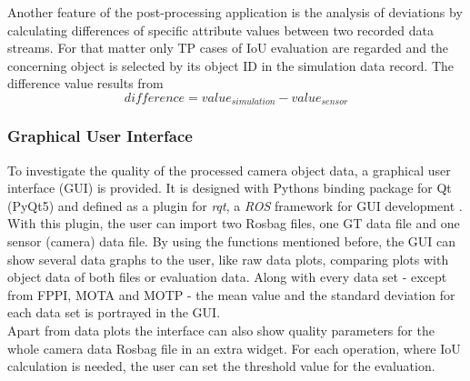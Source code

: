Another feature of the post-processing application is the analysis of deviations by calculating differences of specific attribute values between two recorded data streams. For that matter only \ac{TP} cases of IoU evaluation are regarded and the concerning object is selected by its object \ac{ID} in the simulation data record. The difference value results from
\begin{equation}
	difference = value_{simulation} - value_{sensor} 
	\label{eq:diff}
\end{equation}

\subsubsection{Graphical User Interface}
To investigate the quality of the processed camera object data, a graphical user interface (GUI) is provided. It is designed with Pythons binding package for Qt (PyQt5) \cite{PyQt5} and defined as a plugin for \textit{rqt}, a \textit{ROS} framework for GUI development \cite{rqt}.
With this plugin, the user can import two Rosbag files, one GT data file and one sensor (camera) data file.
By using the functions mentioned before, the GUI can show several data graphs to the user, like raw data plots, comparing plots with object data of both files or evaluation data. 
Along with every data set - except from FPPI, MOTA and MOTP - the mean value and the standard deviation for each data set is portrayed in the GUI. \\
Apart from data plots the interface can also show quality parameters for the whole camera data Rosbag file in an extra widget. For each operation, where IoU calculation is needed, the user can set the threshold value for the evaluation. 